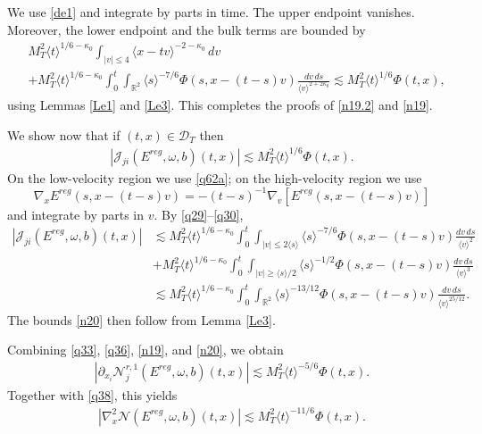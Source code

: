 \documentclass[reqno,11pt]{amsart}
\numberwithin{equation}{section}
\def\R{{\mathbb R}}
\def\R{{\bf R}}
\def\R{\mathbb{R}}
\begin{document}
We use \eqref{de1} and integrate by parts in time.
The upper endpoint vanishes. Moreover, the lower endpoint and the bulk terms are bounded by
\begin{align*}
&M_T^2\langle t\rangle^{1/6-\kappa_0}
\!\!\int_{|v|\leq4}\langle x-tv\rangle^{-2-\kappa_0}\,dv\\
&+M_T^2\langle t\rangle^{1/6-\kappa_0}
\int_0^t\!\!\int_{\R^2}\langle s\rangle^{-7/6}\Phi(s,x-(t-s)v)
\frac{dv\,ds}{\langle v\rangle^{2+2\kappa_0}}\lesssim M_T^2\langle t\rangle^{1/6}\Phi(t,x),
\end{align*}
using Lemmas \ref{Le1} and \ref{Le3}. This completes the proofs of \eqref{n19.2} and \eqref{n19}.

We show now that if $(t,x)\in\mathcal{D}_T$ then
\begin{align}\label{n20}
|\mathcal J_{ji}(E^{reg},\omega,b)(t,x)|\lesssim M_T^2\langle t\rangle^{1/6}\Phi(t,x).
\end{align}
On the low-velocity region we use \eqref{q62a}; on the high-velocity region we use
\[
\nabla_xE^{reg}(s,x-(t-s)v)=-(t-s)^{-1}\nabla_v[E^{reg}(s,x-(t-s)v)]
\]
and integrate by parts in $v$. By \eqref{q29}--\eqref{q30},
\begin{align*}
|\mathcal J_{ji}(E^{reg},\omega,b)(t,x)|
&\lesssim M_T^2\langle t\rangle^{1/6-\kappa_0}
\int_0^t\!\!\int_{|v|\leq2\langle s\rangle}
\langle s\rangle^{-7/6}\Phi(s,x-(t-s)v)\frac{dv\,ds}{\langle v\rangle^2}\\
&+M_T^2\langle t\rangle^{1/6-\kappa_0}
\int_0^t\!\!\int_{|v|\geq\langle s\rangle/2}
\langle s\rangle^{-1/2}\Phi(s,x-(t-s)v)\frac{dv\,ds}{\langle v\rangle^3}\\
&\lesssim M_T^2\langle t\rangle^{1/6-\kappa_0}
\int_0^t\!\!\int_{\R^2}
\langle s\rangle^{-13/12}\Phi(s,x-(t-s)v)
\frac{dv\,ds}{\langle v\rangle^{25/12}}.
\end{align*}
The bounds \eqref{n20} then follow from Lemma \ref{Le3}.

Combining \eqref{q33}, \eqref{q36}, \eqref{n19}, and \eqref{n20}, we obtain
\begin{align}\label{q37}
\left|\partial_{x_i}\mathcal N_j^{r,1}(E^{reg},\omega,b)(t,x)\right|
\lesssim M_T^2\langle t\rangle^{-5/6}\Phi(t,x).
\end{align}
Together with \eqref{q38}, this yields
\begin{align}\label{q38a}
\left|\nabla_x^2\mathcal N(E^{reg},\omega,b)(t,x)\right|
\lesssim M_T^2\langle t\rangle^{-11/6}\Phi(t,x).
\end{align}
\end{document}
